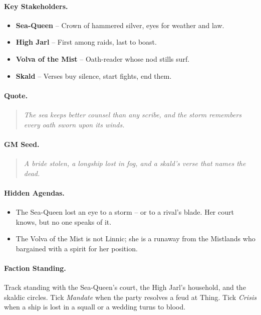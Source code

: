 \paragraph{Key Stakeholders.}
\begin{itemize}
  \item \textbf{Sea-Queen} -- Crown of hammered silver, eyes for weather and law.
  \item \textbf{High Jarl} -- First among raids, last to boast.
  \item \textbf{Volva of the Mist} -- Oath-reader whose nod stills surf.
  \item \textbf{Skald} -- Verses buy silence, start fights, end them.
\end{itemize}

\paragraph{Quote.}
\begin{quote}
\emph{\textquotedbl The sea keeps better counsel than any scribe, and the storm remembers every oath sworn upon its winds.\textquotedbl}
\end{quote}

\paragraph{GM Seed.}
\begin{quote}
\emph{A bride stolen, a longship lost in fog, and a skald's verse that names the dead.}
\end{quote}

\paragraph{Hidden Agendas.}
\begin{itemize}
  \item The Sea-Queen lost an eye to a storm -- or to a rival's blade. Her court knows, but no one speaks of it.
  \item The Volva of the Mist is not Linnic; she is a runaway from the Mistlands who bargained with a spirit for her position.
\end{itemize}

\paragraph{Faction Standing.}
Track standing with the Sea-Queen's court, the High Jarl's household, and the skaldic circles. Tick \textit{Mandate} when the party resolves a feud at Thing. Tick \textit{Crisis} when a ship is lost in a squall or a wedding turns to blood.

